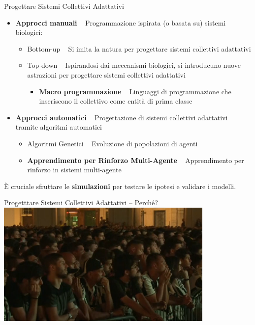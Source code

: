 \documentclass[presentation, 10pt,aspectratio=169]{beamer}\mode<presentation>{\usetheme{AMSBolognaFC}}
\begin{document}
\begin{frame}{Progettare Sistemi Collettivi Adattativi}
	\begin{itemize}
		\item \textbf{Approcci manuali} \faArrowRight ~ Programmazione ispirata (o basata su) sistemi biologici:
		\begin{itemize}
			\item \alert{Bottom-up} \faArrowRight ~ Si imita la natura per progettare sistemi collettivi adattativi
			\item \alert{Top-down} \faArrowRight ~ Ispirandosi dai meccanismi biologici, si introducuno nuove astrazioni per progettare sistemi collettivi adattativi
			\begin{itemize}
				\item \textbf{Macro programmazione} \faArrowRight ~ Linguaggi di programmazione che inseriscono il collettivo come entità di prima classe
			\end{itemize}
		\end{itemize}
		\item \textbf{Approcci automatici} \faArrowRight ~ Progettazione di sistemi collettivi adattativi tramite algoritmi automatici
		\begin{itemize}
			\item \alert{Algoritmi Genetici} \faArrowRight ~ Evoluzione di popolazioni di agenti
			\item \textbf{Apprendimento per Rinforzo Multi-Agente} \faArrowRight ~ Apprendimento per rinforzo in sistemi multi-agente
		\end{itemize}
	\end{itemize}

	È cruciale sfruttare le \alert{\textbf{simulazioni}} per testare le ipotesi e validare i modelli.
\end{frame}
\begin{frame}{Progetttare Sistemi Collettivi Adattativi -- Perché?}
	\href{https://www.youtube.com/watch?v=P0BTSKuCAOM}{
	\includegraphics[width=0.8\textwidth]{img/turin-stampede.png}
	}
\end{frame}
\end{document}
